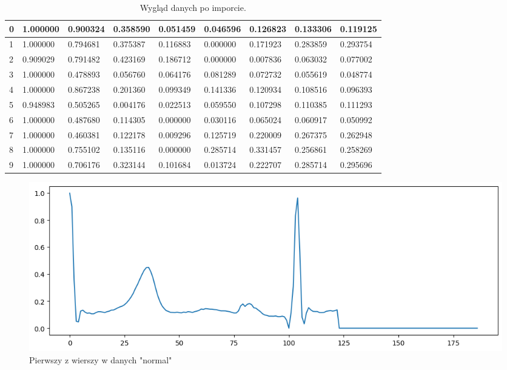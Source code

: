 \documentclass[12pt,a4paper]{article}
\begin{document}
\begin{table}[H]
    \centering
    \begin{tabular}{|l|l|l|l|l|l|l|l|l|}
    \hline
        0 & 1.000000 & 0.900324 & 0.358590 & 0.051459 & 0.046596 & 0.126823 & 0.133306 & 0.119125 \\ \hline
        1 & 1.000000 & 0.794681 & 0.375387 & 0.116883 & 0.000000 & 0.171923 & 0.283859 & 0.293754 \\ \hline
        2 & 0.909029 & 0.791482 & 0.423169 & 0.186712 & 0.000000 & 0.007836 & 0.063032 & 0.077002 \\ \hline
        3 & 1.000000 & 0.478893 & 0.056760 & 0.064176 & 0.081289 & 0.072732 & 0.055619 & 0.048774 \\ \hline
        4 & 1.000000 & 0.867238 & 0.201360 & 0.099349 & 0.141336 & 0.120934 & 0.108516 & 0.096393 \\ \hline
        5 & 0.948983 & 0.505265 & 0.004176 & 0.022513 & 0.059550 & 0.107298 & 0.110385 & 0.111293 \\ \hline
        6 & 1.000000 & 0.487680 & 0.114305 & 0.000000 & 0.030116 & 0.065024 & 0.060917 & 0.050992 \\ \hline
        7 & 1.000000 & 0.460381 & 0.122178 & 0.009296 & 0.125719 & 0.220009 & 0.267375 & 0.262948 \\ \hline
        8 & 1.000000 & 0.755102 & 0.135116 & 0.000000 & 0.285714 & 0.331457 & 0.256861 & 0.258269 \\ \hline
        9 & 1.000000 & 0.706176 & 0.323144 & 0.101684 & 0.013724 & 0.222707 & 0.285714 & 0.295696 \\ \hline
    \end{tabular}
    \caption{Wygląd danych po imporcie.}
    \label{tab:dane_po_imporcie}
\end{table}

\begin{figure}[h]
    \centering
    \includegraphics[width=1\linewidth]{pierwszy_wiersz_normal.png}
    \caption{Pierwszy z wierszy w danych "normal"}
    \label{fig:pierwszy-wiersz-normal}
\end{figure}
\end{document}
